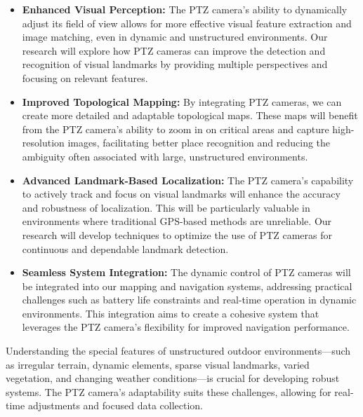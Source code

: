 \documentclass[runningheads]{llncs}
\begin{document}
\begin{itemize}
\item \textbf{Enhanced Visual Perception:} The PTZ camera's ability to dynamically adjust its field of view allows for more effective visual feature extraction and image matching, even in dynamic and unstructured environments. Our research will explore how PTZ cameras can improve the detection and recognition of visual landmarks by providing multiple perspectives and focusing on relevant features.
\item \textbf{Improved Topological Mapping:} By integrating PTZ cameras, we can create more detailed and adaptable topological maps. These maps will benefit from the PTZ camera's ability to zoom in on critical areas and capture high-resolution images, facilitating better place recognition and reducing the ambiguity often associated with large, unstructured environments.
\item \textbf{Advanced Landmark-Based Localization:} The PTZ camera's capability to actively track and focus on visual landmarks will enhance the accuracy and robustness of localization. This will be particularly valuable in environments where traditional GPS-based methods are unreliable. Our research will develop techniques to optimize the use of PTZ cameras for continuous and dependable landmark detection.
\item \textbf{Seamless System Integration:} The dynamic control of PTZ cameras will be integrated into our mapping and navigation systems, addressing practical challenges such as battery life constraints and real-time operation in dynamic environments. This integration aims to create a cohesive system that leverages the PTZ camera's flexibility for improved navigation performance.
\end{itemize}

Understanding the special features of unstructured outdoor environments—such as irregular terrain, dynamic elements, sparse visual landmarks, varied vegetation, and changing weather conditions—is crucial for developing robust systems. The PTZ camera's adaptability suits these challenges, allowing for real-time adjustments and focused data collection.

\end{document}
